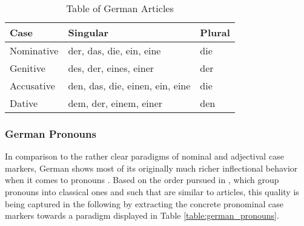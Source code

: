 \documentclass[11pt,a4paper,twoside,openright]{scrbook}
\begin{document}
\begin{table}[!htbp]
\centering
\begin{tabular}{|p{}||p{5cm}|p{5cm}|}
 \hline
 Case & Singular & Plural \\ [1ex]
 \hline\hline
 Nominative & der, das, die, ein, eine & die \\ [1ex]
 \hline
 Genitive & des, der, eines, einer & der \\ [1ex]
 \hline
 Accusative & den, das, die, einen, ein, eine & die  \\ [1ex]
 \hline
 Dative & dem, der, einem, einer & den  \\ [1ex]
 \hline
\end{tabular}
\caption{Table of German Articles}
\label{table:german_articles}
\end{table}



\subsubsection{German Pronouns}

In comparison to the rather clear paradigms of nominal and adjectival case markers, German shows most of its originally much richer inflectional behavior when it comes to pronouns \citep{hentschel2009ger}. Based on the order pursued in \citet{thieroff2012ger}, which group pronouns into classical ones and such that are similar to articles, this quality is being captured in the following by extracting the concrete pronominal case markers towards a paradigm displayed in Table \ref{table:german_pronouns}.
\end{document}
